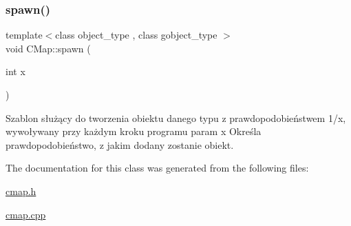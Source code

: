 \subsubsection{\texorpdfstring{spawn()}{spawn()}}
{\footnotesize\ttfamily template$<$class object\+\_\+type , class gobject\+\_\+type $>$ \\
void C\+Map\+::spawn (\begin{DoxyParamCaption}\item[{int}]{x }\end{DoxyParamCaption})\hspace{0.3cm}{\ttfamily [inline]}}



Szablon służący do tworzenia obiektu danego typu z prawdopodobieństwem 1/x, wywoływany przy każdym kroku programu param x Określa prawdopodobieństwo, z jakim dodany zostanie obiekt. 



The documentation for this class was generated from the following files\+:\begin{DoxyCompactItemize}
\item 
\mbox{\hyperlink{cmap_8h}{cmap.\+h}}\item 
\mbox{\hyperlink{cmap_8cpp}{cmap.\+cpp}}\end{DoxyCompactItemize}
